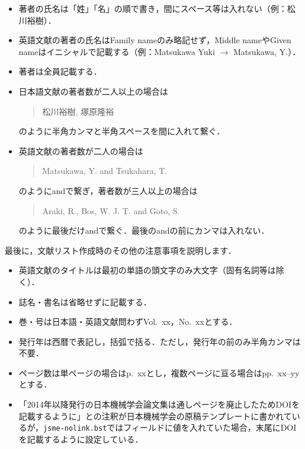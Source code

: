 \documentclass[a4paper,fleqn,uplatex,dvipdfmx]{jsarticle}
\newcommand{\jsmefile}{\texttt{jsme-nolink.bst}}
\begin{document}
\begin{tcolorbox}[enhanced, title=\textgt{文献リスト作成の注意事項（著者名）}, drop fuzzy shadow]
    \begin{itemize}
        \item 著者の氏名は「姓」「名」の順で書き，間にスペース等は入れない（例：松川裕樹）．
        \item 英語文献の著者の氏名はFamily nameのみ略記せず，Middle nameやGiven nameはイニシャルで記載する（例：Matsukawa Yuki $\to$ Matsukawa, Y.）．
        \item 著者は全員記載する．
        \item 日本語文献の著者数が二人以上の場合は
            \begin{quote}
                松川裕樹, 塚原隆裕        
            \end{quote}
            のように半角カンマと半角スペースを間に入れて繋ぐ．
        \item 英語文献の著者数が二人の場合は
            \begin{quote}
                Matsukawa, Y. and Tsukahara, T.        
            \end{quote}
            のようにandで繋ぎ，著者数が三人以上の場合は
            \begin{quote}
                Araki, R., Bos, W. J. T. and Goto, S.            
            \end{quote}
            のように最後だけandで繋ぐ．最後のandの前にカンマは入れない．
    \end{itemize}
\end{tcolorbox}
\noindent
最後に，文献リスト作成時のその他の注意事項を説明します．
\begin{tcolorbox}[enhanced, title=\textgt{\large 文献リスト作成の注意事項（その他）}, drop fuzzy shadow]
    \begin{itemize}
        \item 英語文献のタイトルは最初の単語の頭文字のみ大文字（固有名詞等は除く）．
        \item 誌名・書名は省略せずに記載する．
        \item 巻・号は日本語・英語文献問わずVol.~xx，No.~xxとする．
        \item 発行年は西暦で表記し，括弧で括る．ただし，発行年の前のみ半角カンマは不要．
        \item ページ数は単ページの場合はp.~xxとし，複数ページに亘る場合はpp.~xx--yyとする．
        \item 「2014年以降発行の日本機械学会論文集は通しページを廃止したためDOIを記載するように」との注釈が日本機械学会の原稿テンプレートに書かれているが，\jsmefile では\ttdoi フィールドに値を入れていた場合，末尾にDOIを記載するように設定している．
    \end{itemize}
\end{tcolorbox}
\end{document}
